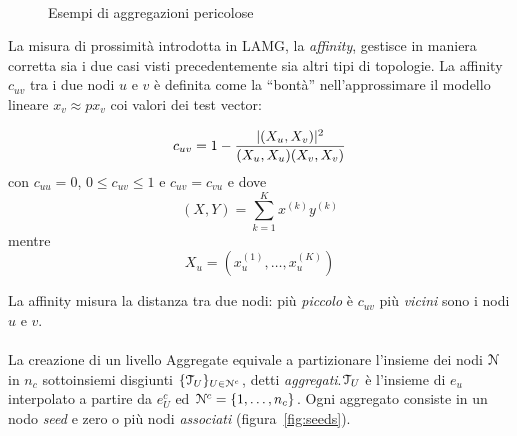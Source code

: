 \begin{figure}%
\centering
{} \label{fig:AggA} \quad
{} \label{fig:AggB}\\
\caption{Esempi di aggregazioni pericolose}
\label{fig:Agg}%
\end{figure}%

La misura di prossimità introdotta in LAMG, la \emph{affinity}, gestisce in maniera corretta sia i due casi visti precedentemente sia altri tipi di topologie.
La affinity $c_{uv}$ tra i due nodi $u$ e $v$ è definita come la “bontà'' nell'approssimare  il modello lineare $x_v \approx px_v$ coi valori dei test vector:

\begin{equation}
\label{eqn:Affinity}
c_{uv} = 1 - \frac{ \lvert( X_u, X_v) \rvert^2}{(X_u,X_u)(X_v,X_v)}
\end{equation} 
con $c_{uu} = 0$, $0\le c_{uv} \le 1$ e $c_{uv} = c_{vu}$ e dove
\begin{equation*}
(X,Y) = \sum_{k=1}^K x^{(k)}y^{(k)}
\end{equation*}
mentre 
\begin{equation*}
X_u = (x_u^{(1)}, \dots, x_u^{(K)})
\end{equation*} 

La affinity misura la distanza tra due nodi: più \emph{piccolo} è $c_{uv}$ più \emph{vicini} sono i nodi $u$ e $v$.\\
\\
La creazione di un livello Aggregate equivale a partizionare l'insieme dei nodi $\mathcal{N}$ in $n_c$ sottoinsiemi disgiunti $\{\mathcal{T}_U\}_{U\in\mathcal{N}^c}$, detti \emph{aggregati}.$\mathcal{T}_U$ è l'insieme di $e_u$ interpolato a partire da $e_U^c$ ed $\mathcal{N}^c = \{1,\dots,n_c\}$.
Ogni aggregato consiste in un nodo \emph{seed} e zero o più nodi \emph{associati} (figura~\vref{fig:seeds}).

